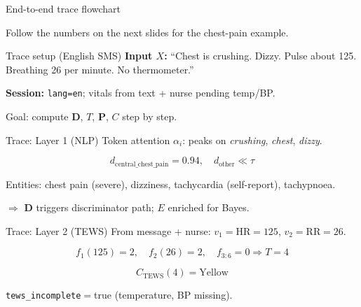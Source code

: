 \documentclass[aspectratio=169,11pt]{beamer}
\begin{document}
\begin{frame}{End-to-end trace flowchart}
	\begin{center}
	\end{center}
	\footnotesize Follow the numbers on the next slides for the chest-pain example.
\end{frame}

\begin{frame}{Trace setup (English SMS)}
	\textbf{Input $X$:} ``Chest is crushing. Dizzy. Pulse about 125. Breathing 26 per minute. No thermometer.''

	\textbf{Session:} \texttt{lang=en}; vitals from text + nurse pending temp/BP.

	Goal: compute $\mathbf{D}$, $T$, $\mathbf{P}$, $C$ step by step.
\end{frame}

\begin{frame}{Trace: Layer 1 (NLP)}
	Token attention $\alpha_i$: peaks on \textit{crushing}, \textit{chest}, \textit{dizzy}.

	\[
	d_{\text{central\_chest\_pain}} = 0.94,\quad
	d_{\text{other}} \ll \tau
	\]

	Entities: chest pain (severe), dizziness, tachycardia (self-report), tachypnoea.

	$\Rightarrow$ $\mathbf{D}$ triggers discriminator path; $E$ enriched for Bayes.
\end{frame}

\begin{frame}{Trace: Layer 2 (TEWS)}
	From message + nurse: $v_1=\mathrm{HR}=125$, $v_2=\mathrm{RR}=26$.

	\[
	f_1(125)=2,\quad f_2(26)=2,\quad f_{3:6}=0
	\Rightarrow T = 4
	\]

	\[
	C_{\text{TEWS}}(4) = \text{Yellow}
\]

	\texttt{tews\_incomplete}$=$true (temperature, BP missing).
\end{frame}
\end{document}
